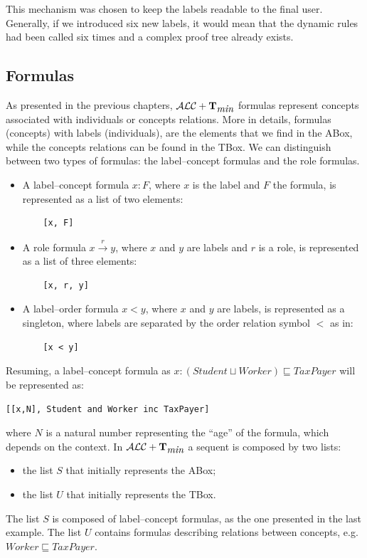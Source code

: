 \documentclass[a4paper, 11pt, oneside]{duthesis}
\newcommand{\tip}{{\bf T}}
\newcommand{\alctmin}{\mathcal{ALC}+\tip_{\mbox{\em min}}}
\newcommand{\trans}[1]{\stackrel{#1}{\longrightarrow}}
\begin{document}
This mechanism was chosen to keep the labels readable to the final user.
Generally, if we introduced six new labels, it would mean that the dynamic rules had been called six times and a complex proof tree already exists.

\subsection{Formulas}
As presented in the previous chapters, $\alctmin$ formulas represent concepts associated with individuals or concepts relations.
More in details, formulas (concepts) with labels (individuals), are the elements that we find in the ABox, while the concepts relations can be found in the TBox.
We can distinguish between two types of formulas: the label--concept formulas and the role formulas.
\begin{itemize}
\item A label--concept formula $x : F$, where $x$ is the label and $F$ the formula, is represented as a list of two elements:
\begin{verbatim}
    [x, F]
\end{verbatim}
\item A role formula $x \trans{r} y$, where $x$ and $y$ are labels and $r$ is a role, is represented as a list of three elements:
\begin{verbatim}
    [x, r, y]
\end{verbatim}
\item A label--order formula $x < y$, where $x$ and $y$ are labels, is represented as a singleton, where labels are separated by the order relation symbol $<$ as in:
\begin{verbatim}
    [x < y]
\end{verbatim}
\end{itemize}
Resuming, a label--concept formula as $x : (Student \sqcup Worker) \sqsubseteq TaxPayer$ will be represented as:
\begin{center}\texttt{[[x,N], Student and Worker inc TaxPayer]}\end{center}

where $N$ is a natural number representing the ``age'' of the formula, which depends on the context.
In $\alctmin$ a sequent is composed by two lists:
\begin{itemize}
\item the list $S$ that initially represents the ABox;
\item the list $U$ that initially represents the TBox.
\end{itemize}
The list $S$ is composed of label--concept formulas, as the one presented in the last example.
The list $U$ contains formulas describing relations between concepts, e.g. $Worker \sqsubseteq TaxPayer$.
\end{document}
